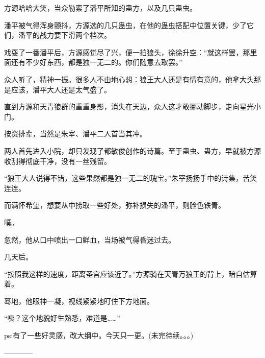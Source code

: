 \begin{this_body}
方源哈哈大笑，当众勒索了潘平所知的蛊方，以及几只蛊虫。

潘平被气得浑身颤抖，方源选的几只蛊虫，在他的蛊虫搭配中位置关键，少了它们，潘平的战力要下滑两个档次。

戏耍了一番潘平后，方源感觉尽了兴，便一拍狼头，徐徐升空：“就这样罢，那里面还有不少好东西，都是独一无二的。你们随意去取罢。”

众人听了，精神一振。很多人不由地心想：狼王大人还是有情有意的，他拿大头那是应该，潘平大人还是太气盛了。

直到方源和天青狼群的重重身影，消失在天边，众人这才敢挪动脚步，走向星光小门。

按资排辈，当然是朱宰、潘平二人首当其冲。

两人首先进入小院，却只发现了都敏俊创作的诗篇。至于蛊虫、蛊方，早就被方源收刮得彻底干净，没有一丝残留。

“狼王大人说得不错，这些果然都是独一无二的瑰宝。”朱宰扬扬手中的诗集，苦笑连连。

而满怀希望，想要从中捞取一些好处，弥补损失的潘平，则脸色铁青。

噗。

忽然，他从口中喷出一口鲜血，当场被气得昏迷过去。

几天后。

“按照我这样的速度，距离圣宫应该近了。”方源骑在天青万狼王的背上，暗自估算着。

蓦地，他眼神一凝，视线紧紧地盯住下方地面。

“咦？这个地貌好生熟悉，难道是……”

ps:有了一些好灵感，改大纲中。今天只一更。(未完待续。。。)

------------

\end{this_body}

